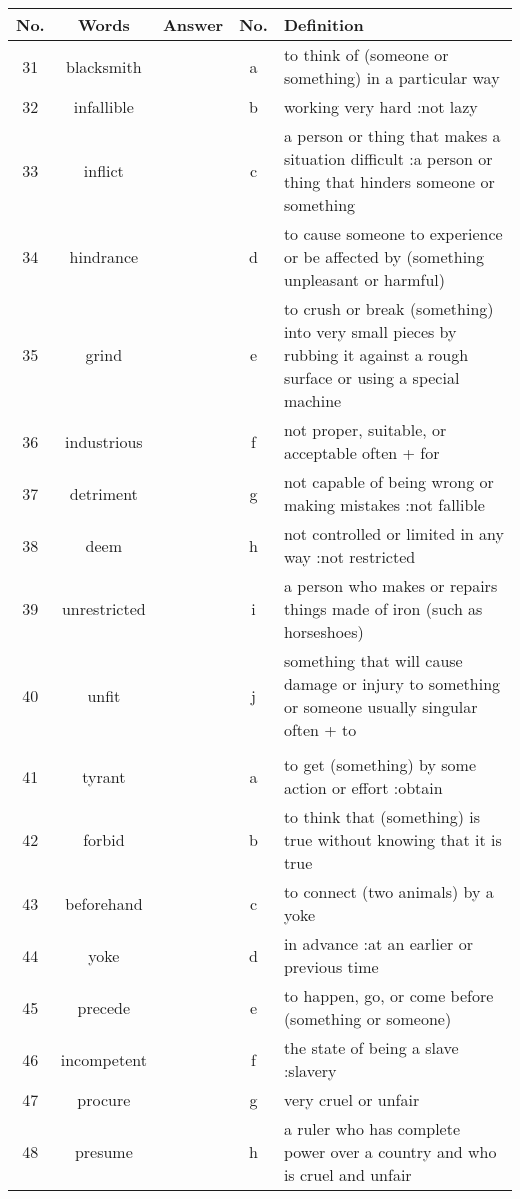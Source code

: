\documentclass[a4paper]{article}
\begin{document}
\begin{center}
\begin{tabular}{|c|c|c|c|m{}|}
\hline
No. & Words & Answer & No. & Definition \\
\hline
 31 & blacksmith & & a &  to think of (someone or something) in a particular way \\
\hline
 32 & infallible & & b &  working very hard :not lazy \\
\hline
 33 & inflict & & c &  a person or thing that makes a situation difficult :a person or thing that hinders someone or something \\
\hline
 34 & hindrance & & d &  to cause someone to experience or be affected by (something unpleasant or harmful) \\
\hline
 35 & grind & & e &  to crush or break (something) into very small pieces by rubbing it against a rough surface or using a special machine \\
\hline
 36 & industrious & & f &  not proper, suitable, or acceptable often + for \\
\hline
 37 & detriment & & g &  not capable of being wrong or making mistakes :not fallible \\
\hline
 38 & deem & & h &  not controlled or limited in any way :not restricted \\
\hline
 39 & unrestricted & & i &  a person who makes or repairs things made of iron (such as horseshoes)\\
\hline
 40 & unfit & & j &  something that will cause damage or injury to something or someone usually singular often + to \\
\hline
 & & & & \\
\hline
 41 & tyrant & & a &  to get (something) by some action or effort :obtain \\
\hline
 42 & forbid & & b &  to think that (something) is true without knowing that it is true \\
\hline
 43 & beforehand & & c &  to connect (two animals) by a yoke \\
\hline
 44 & yoke & & d &  in advance :at an earlier or previous time \\
\hline
 45 & precede & & e &  to happen, go, or come before (something or someone) \\
\hline
 46 & incompetent & & f &  the state of being a slave :slavery \\
\hline
 47 & procure & & g &  very cruel or unfair \\
\hline
 48 & presume & & h &  a ruler who has complete power over a country and who is cruel and unfair \\

\end{tabular}
\end{center}
\end{document}
